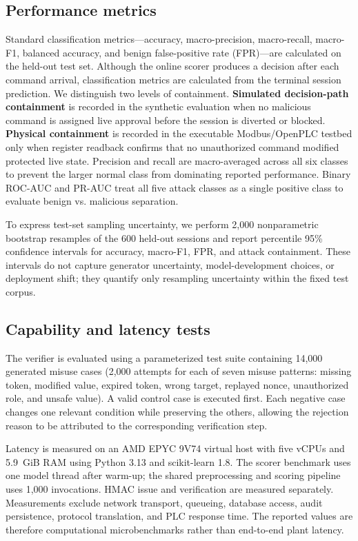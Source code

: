 \documentclass[journal]{IEEEtran}
\begin{document}
\subsection{Performance metrics}
Standard classification metrics—accuracy, macro-precision, macro-recall, macro-F1, balanced accuracy, and benign false-positive rate (FPR)—are calculated on the held-out test set. Although the online scorer produces a decision after each command arrival, classification metrics are calculated from the terminal session prediction. We distinguish two levels of containment. \textbf{Simulated decision-path containment} is recorded in the synthetic evaluation when no malicious command is assigned live approval before the session is diverted or blocked. \textbf{Physical containment} is recorded in the executable Modbus/OpenPLC testbed only when register readback confirms that no unauthorized command modified protected live state. Precision and recall are macro-averaged across all six classes to prevent the larger normal class from dominating reported performance. Binary ROC-AUC and PR-AUC treat all five attack classes as a single positive class to evaluate benign vs. malicious separation.

To express test-set sampling uncertainty, we perform 2,000 nonparametric bootstrap resamples of the 600 held-out sessions and report percentile 95\% confidence intervals for accuracy, macro-F1, FPR, and attack containment. These intervals do not capture generator uncertainty, model-development choices, or deployment shift; they quantify only resampling uncertainty within the fixed test corpus.

\subsection{Capability and latency tests}
The verifier is evaluated using a parameterized test suite containing 14,000 generated misuse cases (2,000 attempts for each of seven misuse patterns: missing token, modified value, expired token, wrong target, replayed nonce, unauthorized role, and unsafe value). A valid control case is executed first. Each negative case changes one relevant condition while preserving the others, allowing the rejection reason to be attributed to the corresponding verification step.

Latency is measured on an AMD EPYC 9V74 virtual host with five vCPUs and 5.9~GiB RAM using Python 3.13 and scikit-learn 1.8. The scorer benchmark uses one model thread after warm-up; the shared preprocessing and scoring pipeline uses 1,000 invocations. HMAC issue and verification are measured separately. Measurements exclude network transport, queueing, database access, audit persistence, protocol translation, and PLC response time. The reported values are therefore computational microbenchmarks rather than end-to-end plant latency.
\end{document}
